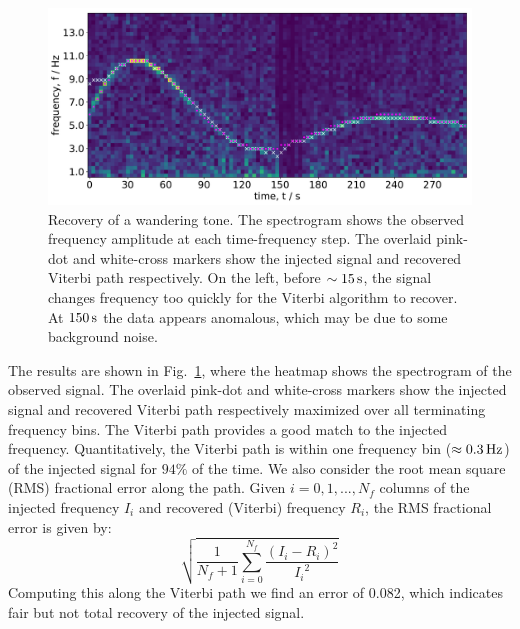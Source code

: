 \documentclass[paper-main.tex]{subfiles}
\begin{document}
\begin{figure}
	\includegraphics[width=\textwidth]{figures/expt_overlay_2_viterbi_test_webcam.pdf}
	\caption{\label{fig:viterbi_overlay}
Recovery of a wandering tone. 
The spectrogram shows the observed frequency amplitude at each time-frequency step. 
The overlaid pink-dot and white-cross markers show the injected signal and recovered Viterbi path respectively. 
On the left, before $\sim 15\,{\rm s}$, the signal changes frequency too quickly for the Viterbi algorithm to recover. 
At $150\,{\rm s}$ the data appears anomalous, which may be due to some background noise. }
\end{figure}


The results are shown in Fig.~\ref{fig:viterbi_overlay}, where the heatmap shows the spectrogram of the observed signal. 
The overlaid pink-dot and white-cross markers show the injected signal and recovered Viterbi path respectively maximized over all terminating frequency bins. 
The Viterbi path provides a good match to the injected frequency. 
Quantitatively, the Viterbi path is within one frequency bin ($\approx 0.3\,{\rm Hz}$) of the injected signal for $94\%$ of the time. 
We also consider the root mean square (RMS) fractional error along the path. Given $i=0,1,...,N_f$ columns of the injected frequency $I_i$ and recovered (Viterbi) frequency $R_i$, the RMS fractional error is given by:
\begin{equation}
\sqrt{ \frac{1}{N_f+1} \sum_{i=0}^{N_f} \frac{(I_i - R_i)^2}{{I_i}^2} }
\end{equation}
Computing this along the Viterbi path we find an error of 0.082, which indicates fair but not total recovery of the injected signal.
\end{document}
